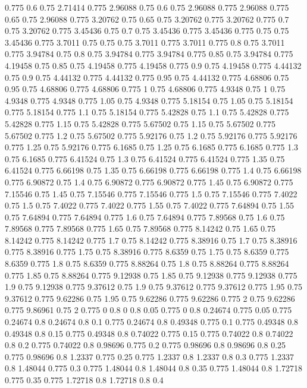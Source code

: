 0.775 0.6
0.75 2.71414
0.775 2.96088
0.75 0.6
0.75 2.96088
0.775 2.96088
0.775 0.65
0.75 2.96088
0.775 3.20762
0.75 0.65
0.75 3.20762
0.775 3.20762
0.775 0.7
0.75 3.20762
0.775 3.45436
0.75 0.7
0.75 3.45436
0.775 3.45436
0.775 0.75
0.75 3.45436
0.775 3.7011
0.75 0.75
0.75 3.7011
0.775 3.7011
0.775 0.8
0.75 3.7011
0.775 3.94784
0.75 0.8
0.75 3.94784
0.775 3.94784
0.775 0.85
0.75 3.94784
0.775 4.19458
0.75 0.85
0.75 4.19458
0.775 4.19458
0.775 0.9
0.75 4.19458
0.775 4.44132
0.75 0.9
0.75 4.44132
0.775 4.44132
0.775 0.95
0.75 4.44132
0.775 4.68806
0.75 0.95
0.75 4.68806
0.775 4.68806
0.775 1
0.75 4.68806
0.775 4.9348
0.75 1
0.75 4.9348
0.775 4.9348
0.775 1.05
0.75 4.9348
0.775 5.18154
0.75 1.05
0.75 5.18154
0.775 5.18154
0.775 1.1
0.75 5.18154
0.775 5.42828
0.75 1.1
0.75 5.42828
0.775 5.42828
0.775 1.15
0.75 5.42828
0.775 5.67502
0.75 1.15
0.75 5.67502
0.775 5.67502
0.775 1.2
0.75 5.67502
0.775 5.92176
0.75 1.2
0.75 5.92176
0.775 5.92176
0.775 1.25
0.75 5.92176
0.775 6.1685
0.75 1.25
0.75 6.1685
0.775 6.1685
0.775 1.3
0.75 6.1685
0.775 6.41524
0.75 1.3
0.75 6.41524
0.775 6.41524
0.775 1.35
0.75 6.41524
0.775 6.66198
0.75 1.35
0.75 6.66198
0.775 6.66198
0.775 1.4
0.75 6.66198
0.775 6.90872
0.75 1.4
0.75 6.90872
0.775 6.90872
0.775 1.45
0.75 6.90872
0.775 7.15546
0.75 1.45
0.75 7.15546
0.775 7.15546
0.775 1.5
0.75 7.15546
0.775 7.4022
0.75 1.5
0.75 7.4022
0.775 7.4022
0.775 1.55
0.75 7.4022
0.775 7.64894
0.75 1.55
0.75 7.64894
0.775 7.64894
0.775 1.6
0.75 7.64894
0.775 7.89568
0.75 1.6
0.75 7.89568
0.775 7.89568
0.775 1.65
0.75 7.89568
0.775 8.14242
0.75 1.65
0.75 8.14242
0.775 8.14242
0.775 1.7
0.75 8.14242
0.775 8.38916
0.75 1.7
0.75 8.38916
0.775 8.38916
0.775 1.75
0.75 8.38916
0.775 8.6359
0.75 1.75
0.75 8.6359
0.775 8.6359
0.775 1.8
0.75 8.6359
0.775 8.88264
0.75 1.8
0.75 8.88264
0.775 8.88264
0.775 1.85
0.75 8.88264
0.775 9.12938
0.75 1.85
0.75 9.12938
0.775 9.12938
0.775 1.9
0.75 9.12938
0.775 9.37612
0.75 1.9
0.75 9.37612
0.775 9.37612
0.775 1.95
0.75 9.37612
0.775 9.62286
0.75 1.95
0.75 9.62286
0.775 9.62286
0.775 2
0.75 9.62286
0.775 9.86961
0.75 2
0.775 0
0.8 0
0.8 0.05
0.775 0
0.8 0.24674
0.775 0.05
0.775 0.24674
0.8 0.24674
0.8 0.1
0.775 0.24674
0.8 0.49348
0.775 0.1
0.775 0.49348
0.8 0.49348
0.8 0.15
0.775 0.49348
0.8 0.74022
0.775 0.15
0.775 0.74022
0.8 0.74022
0.8 0.2
0.775 0.74022
0.8 0.98696
0.775 0.2
0.775 0.98696
0.8 0.98696
0.8 0.25
0.775 0.98696
0.8 1.2337
0.775 0.25
0.775 1.2337
0.8 1.2337
0.8 0.3
0.775 1.2337
0.8 1.48044
0.775 0.3
0.775 1.48044
0.8 1.48044
0.8 0.35
0.775 1.48044
0.8 1.72718
0.775 0.35
0.775 1.72718
0.8 1.72718
0.8 0.4
